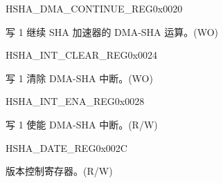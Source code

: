 \begin{register}{H}{SHA\_DMA\_CONTINUE\_REG}{0x0020}\label{regdesc:SHADMACONTINUEREG}
%
%
\regnewline%
\begin{regdesc}\begin{reglist}
\label{fielddesc:SHADMACONTINUE}\item [SHA\_DMA\_CONTINUE] 写 1 继续 SHA 加速器的 DMA-SHA 运算。(WO)
\end{reglist}\end{regdesc}
\end{register}


\begin{register}{H}{SHA\_INT\_CLEAR\_REG}{0x0024}\label{regdesc:SHAINTCLEARREG}
%
%
\regnewline%
\begin{regdesc}\begin{reglist}
\label{fielddesc:SHACLEARINTERRUPT}\item [SHA\_CLEAR\_INTERRUPT] 写 1 清除 DMA-SHA 中断。(WO)
\end{reglist}\end{regdesc}
\end{register}


\begin{register}{H}{SHA\_INT\_ENA\_REG}{0x0028}\label{regdesc:SHAINTENAREG}
%
%
\regnewline%
\begin{regdesc}\begin{reglist}
\label{fielddesc:SHAINTERRUPTENA}\item [SHA\_INTERRUPT\_ENA] 写 1 使能 DMA-SHA 中断。(R/W)
\end{reglist}\end{regdesc}
\end{register}


\begin{register}{H}{SHA\_DATE\_REG}{0x002C}\label{regdesc:SHADATEREG}
%
%
\regnewline%
\begin{regdesc}\begin{reglist}
\label{fielddesc:SHADATE}\item [SHA\_DATE] 版本控制寄存器。(R/W)
\end{reglist}\end{regdesc}
\end{register}





